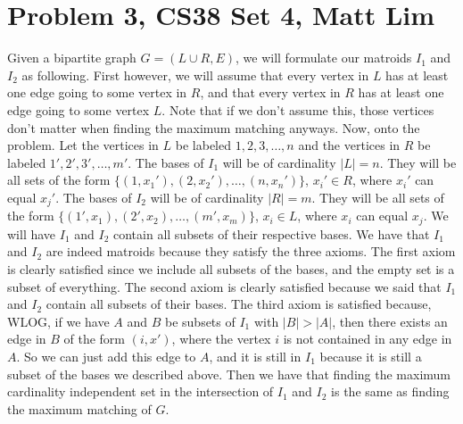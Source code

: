 \documentclass{article}
\begin{document}
\section*{Problem 3, CS38 Set 4, Matt Lim}
Given a bipartite graph $G = (L \cup R, E)$, we will formulate our matroids
$I_1$ and $I_2$ as following. First however, we will assume that every
vertex in $L$ has at least one edge going to some vertex in $R$, and that every
vertex in $R$ has at least one edge going to some vertex $L$. Note that if
we don't assume this, those vertices don't matter when finding the maximum
matching anyways. Now, onto the problem. Let the vertices in $L$ be labeled $1, 2, 3,
\dots, n$ and the vertices in $R$ be labeled $1', 2', 3', \dots, m'$.  The bases
of $I_1$ will be of cardinality $|L| = n$.
They will be all sets of the form $\{(1,x_1'), (2,x_2'), \dots, (n,x_n')\}$,
$x_i' \in R$,
where $x_i'$ can equal $x_j'$. The bases of $I_2$ will be of cardinality $|R| =
m$. They will be all sets of the form $\{(1',x_1), (2',x_2), \dots,
(m',x_m)\}$, $x_i \in L$, where $x_i$ can equal $x_j$. We will have $I_1$ and
$I_2$ contain all subsets of their respective bases. We have that $I_1$ and
$I_2$ are indeed matroids because they satisfy the three axioms. The first axiom
is clearly satisfied since we include all subsets of the bases, and the empty
set is a subset of everything. The second axiom is clearly satisfied because we
said that $I_1$ and $I_2$ contain all subsets of their bases. The third axiom is
satisfied because, WLOG, if we have $A$ and $B$ be subsets of $I_1$ with $|B| >
|A|$, then there exists an edge in $B$ of the form $(i,x')$, where the vertex
$i$ is not contained in any edge in $A$. So we can just add this edge to $A$,
and it is still in $I_1$ because it is still a subset of the bases we described
above.
Then we have that finding
the maximum cardinality independent set in the intersection of $I_1$ and $I_2$
is the same as finding the maximum matching of $G$.
\end{document}

